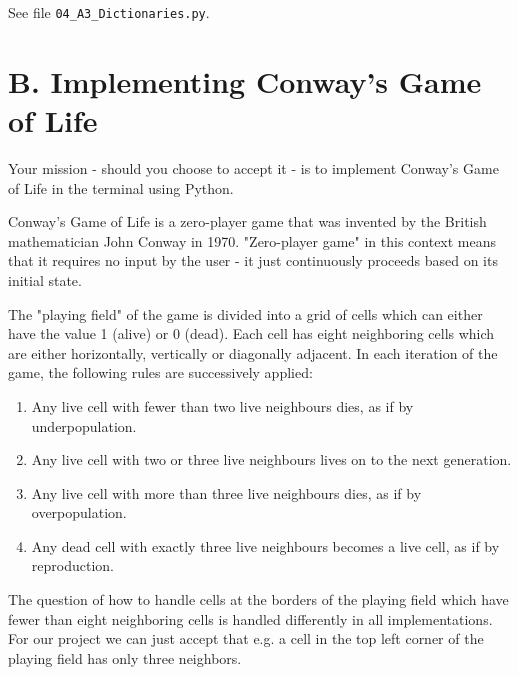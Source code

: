 \begin{solution}
See file \texttt{04\_A3\_Dictionaries.py}.
\end{solution}

\newpage

\section*{B. Implementing Conway's Game of Life}

Your mission - should you choose to accept it - is to implement Conway's Game of Life in the terminal using Python.

\vspace{1em}

\noindent Conway's Game of Life is a zero-player game that was invented by the British mathematician John Conway in 1970. "Zero-player game" in this context means that it requires no input by the user - it just continuously proceeds based on its initial state.

\vspace{1em}

\noindent The "playing field" of the game is divided into a grid of cells which can either have the value 1 (alive) or 0 (dead). Each cell has eight neighboring cells which are either horizontally, vertically or diagonally adjacent. In each iteration of the game, the following rules are successively applied:

\begin{enumerate}

\item Any live cell with fewer than two live neighbours dies, as if by underpopulation.
\item Any live cell with two or three live neighbours lives on to the next generation.
\item Any live cell with more than three live neighbours dies, as if by overpopulation.
\item Any dead cell with exactly three live neighbours becomes a live cell, as if by reproduction.

\end{enumerate}

\noindent The question of how to handle cells at the borders of the playing field which have fewer than eight neighboring cells is handled differently in all implementations. For our project we can just accept that e.g. a cell in the top left corner of the playing field has only three neighbors.

\vspace{1em}

